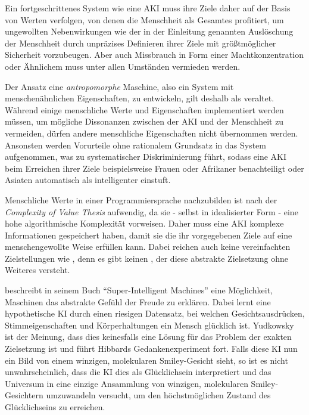 Ein fortgeschrittenes System wie eine AKI muss ihre Ziele daher auf der Basis von Werten verfolgen, von denen die Menschheit als Gesamtes profitiert, um ungewollten Nebenwirkungen wie der in der Einleitung genannten Auslöschung der Menschheit durch unpräzises Definieren ihrer Ziele mit größtmöglicher Sicherheit vorzubeugen. Aber auch Missbrauch in Form einer Machtkonzentration oder Ähnlichem muss unter allen Umständen vermieden werden.

Der Ansatz eine \emph{antropomorphe} Maschine, also ein System mit menschenähnlichen Eigenschaften, zu entwickeln, gilt deshalb als veraltet. Während einige menschliche Werte und Eigenschaften implementiert werden müssen, um mögliche Dissonanzen zwischen der AKI und der Menschheit zu vermeiden, dürfen andere menschliche Eigenschaften nicht übernommen werden. Ansonsten werden Vorurteile ohne rationalem Grundsatz in das System aufgenommen, was zu systematischer Diskriminierung führt, sodass eine AKI beim Erreichen ihrer Ziele beispielsweise Frauen oder Afrikaner benachteiligt oder Asiaten automatisch als intelligenter einstuft.

Menschliche Werte in einer Programmiersprache nachzubilden ist nach der \emph{Complexity of Value Thesis} aufwendig, da sie - selbst in idealisierter Form - eine hohe algorithmische Komplexität vorweisen. Daher muss eine AKI komplexe Informationen gespeichert haben, damit sie die ihr vorgegebenen Ziele auf eine menschengewollte Weise erfüllen kann. Dabei reichen auch keine vereinfachten Zielstellungen wie  , denn es gibt keinen , der diese abstrakte Zielsetzung ohne Weiteres versteht.

\citeauthor{hibbard_super-intelligent_2002} beschreibt in seinem Buch \enquote{Super-Intelligent Machines} eine Möglichkeit, Maschinen das abstrakte Gefühl der Freude zu erklären. Dabei lernt eine hypothetische KI durch einen riesigen Datensatz, bei welchen Gesichtsausdrücken, Stimmeigenschaften und Körperhaltungen ein Mensch glücklich ist. Yudkowsky ist der Meinung, dass dies keinesfalls eine Lösung für das Problem der exakten Zielsetzung ist und führt Hibbards Gedankenexperiment fort. Falls diese KI nun ein Bild von einem winzigen, molekularen Smiley-Gesicht sieht, so ist es nicht unwahrscheinlich, dass die KI dies als Glücklichsein interpretiert und das Universum in eine einzige Ansammlung von winzigen, molekularen Smiley-Gesichtern umzuwandeln versucht, um den höchstmöglichen Zustand des Glücklichseins zu erreichen. 

